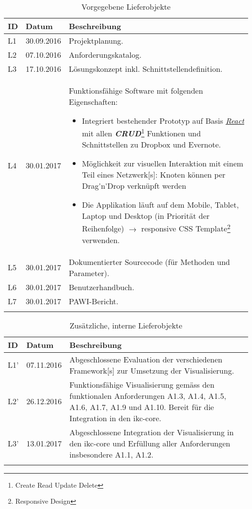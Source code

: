 \begin{longtable}{|p{1cm} | p{2cm} | p{8.1cm}|}
  \hline
    ID & Datum &  Beschreibung \\\hline
    L1 & 30.09.2016 & Projektplanung.\\\hline
    L2 & 07.10.2016 & Anforderungskatalog.\\\hline
    L3 & 17.10.2016 & Lösungskonzept inkl. Schnittstellendefinition.\\\hline
    L4 & 30.01.2017 & Funktionsfähige Software mit folgenden Eigenschaften:
    \begin{itemize}
        \item Integriert bestehender Prototyp auf Basis \hyperref[react]{\textit{React}} mit allen \textbf{\textit{CRUD}}\footnote{Create Read Update Delete} Funktionen und Schnittstellen zu \gls{Dropbox} und \gls{Evernote}.
        \item Möglichkeit zur visuellen Interaktion mit einem 
            Teil eines \gls{Netzwerk}[s]: Knoten können per \gls{Drag'n'Drop} verknüpft werden
        \item Die Applikation läuft auf dem Mobile, Tablet, Laptop und Desktop (in Priorität der Reihenfolge) $\rightarrow$ responsive CSS Template\footnote{\gls{Responsive Design}} verwenden.
    \end{itemize}
    \\\hline
    L5 & 30.01.2017 & Dokumentierter Sourcecode (für Methoden und Parameter).\\\hline
    L6 & 30.01.2017 & Benutzerhandbuch.\\\hline
    L7 & 30.01.2017 & \gls{PAWI}-Bericht.\\\hline
    \caption{Vorgegebene Lieferobjekte}
  \label{tab:set-lieferobjekte}
\end{longtable}
 
\begin{longtable}{|p{1cm} | p{2cm} | p{8.1cm}|}
  \hline
    ID & Datum &  Beschreibung \\\hline
    L1' & 07.11.2016 & Abgeschlossene Evaluation der verschiedenen \gls{Framework}[s] zur Umsetzung der Visualisierung.\\\hline
    L2' & 26.12.2016 & Funktionsfähige Visualisierung gemäss den funktionalen Anforderungen A1.3, A1.4, A1.5, A1.6, A1.7, A1.9 und A1.10. Bereit für die Integration in den \gls{ikc-core}.\\\hline
    L3' & 13.01.2017 & Abgeschlossene Integration der Visualisierung in den \gls{ikc-core} und Erfüllung aller Anforderungen insbesondere A1.1, A1.2.\\\hline
    \caption{Zusätzliche, interne Lieferobjekte}
  \label{tab:add-lieferobjekte}
\end{longtable}

